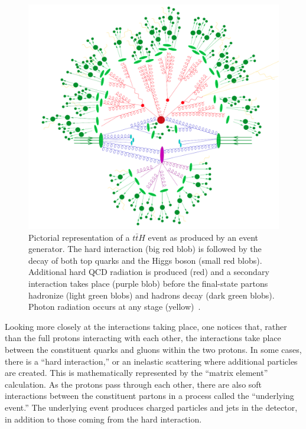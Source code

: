 \begin{figure}[p]
  \centering
  \includegraphics[width=\textwidth, clip=true, trim=0 0 0 0]
  {figs/mc_gen/full_mc_event.png}
  \caption[
    Pictorial representation of a $t\bar{t}H$ event as produced by an event
    generator~\cite{Gleisberg:2008ta}.
  ]{
    Pictorial representation of a $t\bar{t}H$ event as produced by an event
    generator.
    The hard interaction (big red blob) is followed by the decay of both top
    quarks and the Higgs boson (small red blobs).
    Additional hard QCD radiation is produced (red) and a secondary
    interaction takes place (purple blob) before the final-state partons
    hadronize (light green blobs) and hadrons decay (dark green blobs).
    Photon radiation occurs at any stage (yellow)~\cite{Gleisberg:2008ta}.
  }
  \label{fig:mc_event}
\end{figure}

Looking more closely at the interactions taking place, one notices that,
rather than the full protons interacting with each other, the interactions
take place between the constituent quarks and gluons within the two protons.
In some cases, there is a ``hard interaction,'' or an inelastic scattering
where additional particles are created.
This is mathematically represented by the ``matrix element'' calculation.
As the protons pass through each other, there are also soft interactions
between the constituent partons in a process called the ``underlying event.''
The underlying event produces charged particles and jets in the detector, in
addition to those coming from the hard interaction.


